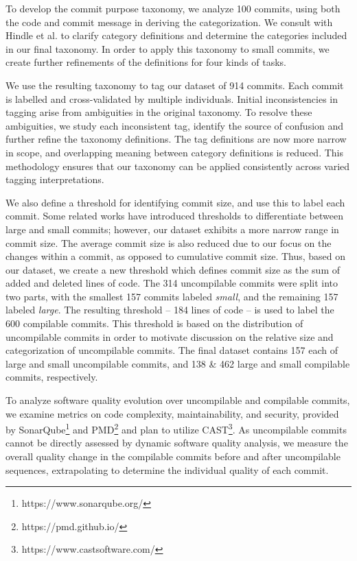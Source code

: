 To develop the commit purpose taxonomy, we analyze 100 commits, using both the code and commit message in deriving the categorization. We consult with Hindle et al. to clarify category definitions and determine the categories included in our final taxonomy. 
In order to apply this taxonomy to small commits, we create further refinements of the definitions for four kinds of tasks. 

We use the resulting taxonomy to tag our dataset of 914 commits. Each commit is labelled and cross-validated by multiple individuals. 
Initial inconsistencies in tagging arise from ambiguities in the original taxonomy. 
To resolve these ambiguities, we study each inconsistent tag, identify the source of confusion and further refine the taxonomy definitions. 
The tag definitions are now more narrow in scope, and overlapping meaning between category definitions is reduced. 
This methodology ensures that our taxonomy can be applied consistently across varied tagging interpretations. 

We also define a threshold for identifying commit size, and use this to label each commit.
Some related works have introduced thresholds to differentiate between large and small commits; however, our dataset exhibits a more narrow range in commit size. 
The average commit size is also reduced due to our focus on the changes within a commit, as opposed to cumulative commit size. 
Thus, based on our dataset, we create a new threshold which defines commit size as the sum of added and deleted lines of code. The 314 uncompilable commits were split into two parts, with the smallest 157 commits labeled \textit{small}, and the remaining 157 labeled \textit{large}. 
The resulting threshold -- 184 lines of code -- is used to label the 600 compilable commits.
This threshold is based on the distribution of uncompilable commits in order to motivate discussion on the relative size and categorization of uncompilable commits. The final dataset contains 157 each of large and small uncompilable commits, and 138 \& 462 large and small compilable commits, respectively.

To analyze software quality evolution over uncompilable and compilable commits, we examine metrics on code complexity, maintainability, and security, provided by SonarQube\footnote{https://www.sonarqube.org/} and PMD\footnote{https://pmd.github.io/} and plan to utilize CAST\footnote{https://www.castsoftware.com/}. As uncompilable commits cannot be directly assessed by dynamic software quality analysis, we measure the overall quality change in the compilable commits before and after uncompilable sequences, extrapolating to determine the individual quality of each commit. 


